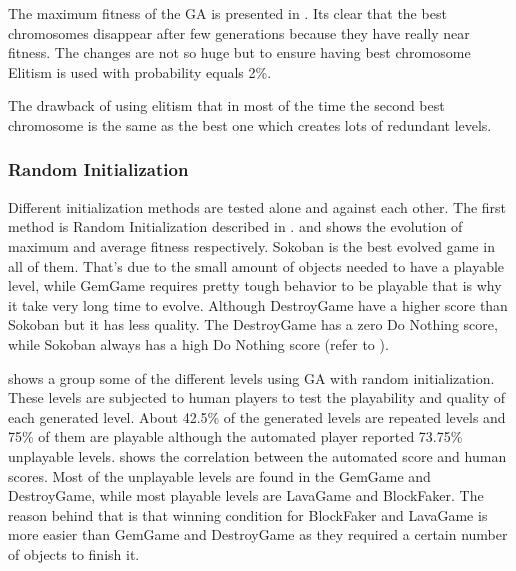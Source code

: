 The maximum fitness of the GA is presented in . Its clear that the best chromosomes disappear after few generations because they have really near fitness. The changes are not so huge but to ensure having best chromosome Elitism is used with probability equals 2\%.


The drawback of using elitism that in most of the time the second best chromosome is the same as the best one which creates lots of redundant levels.\\\par

\subsubsection{Random Initialization}
Different initialization methods are tested alone and against each other. The first method is Random Initialization described in .  and  shows the evolution of maximum and average fitness respectively. Sokoban is the best evolved game in all of them. That's due to the small amount of objects needed to have a playable level, while GemGame requires pretty tough behavior to be playable that is why it take very long time to evolve. Although DestroyGame have a higher score than Sokoban but it has less quality. The DestroyGame has a zero Do Nothing score, while Sokoban always has a high Do Nothing score (refer to ).




 shows a group some of the different levels using GA with random initialization. These levels are subjected to human players to test the playability and quality of each generated level. About 42.5\% of the generated levels are repeated levels and 75\% of them are playable although the automated player reported 73.75\% unplayable levels.  shows the correlation between the automated score and human scores. Most of the unplayable levels are found in the GemGame and DestroyGame, while most playable levels are LavaGame and BlockFaker. The reason behind that is that winning condition for BlockFaker and LavaGame is more easier than GemGame and DestroyGame as they required a certain number of objects to finish it.\\\par

